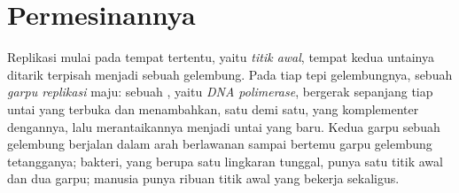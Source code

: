 \section{Permesinannya}

\begin{proposition}\label{prop:g11:dna-replication:forks}
Replikasi mulai pada tempat tertentu, yaitu \emph{titik awal}, tempat
kedua untainya ditarik terpisah menjadi sebuah gelembung. Pada tiap
tepi gelembungnya, sebuah \emph{garpu replikasi}
maju: sebuah , yaitu \emph{DNA polimerase},
bergerak sepanjang tiap untai yang terbuka dan menambahkan, satu demi
satu,  yang komplementer dengannya, lalu merantaikannya
menjadi untai yang baru. Kedua garpu sebuah gelembung berjalan dalam
arah berlawanan sampai bertemu garpu gelembung tetangganya; 
bakteri, yang berupa satu lingkaran tunggal, punya satu titik awal dan
dua garpu;  manusia punya ribuan titik awal yang bekerja
sekaligus.
\end{proposition}
\admitted


